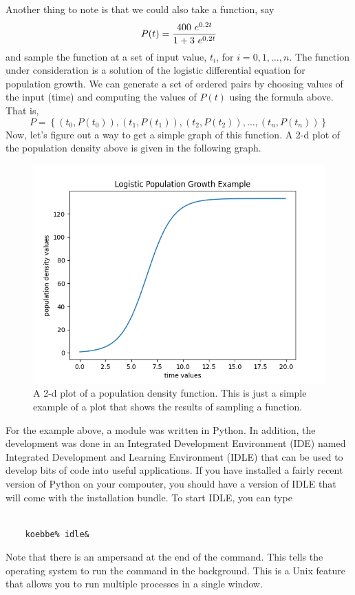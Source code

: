 \documentclass[10pt,fleqn]{article}
\begin{document}
Another thing to note is that we could also take a function, say
\[
   P(t) = {{400\ e^{0.2 t}}\over{1 + 3\ e^{0.2 t}}}
\]
and sample the function at a set of input value, \(t_i\), for
\(i=0,1,\ldots,n\). The function under consideration is a solution of the
logistic differential equation for population growth. We can generate a set of
ordered pairs by choosing values of the input (time) and computing the values of
$P(t)$ using the formula above. That is,
\[
  P = \left\lbrace 
       (t_0, P(t_0)), (t_1, P(t_1)), (t_2, P(t_2)), \ldots, (t_n, P(t_n))
      \right\rbrace 
\]
Now, let's figure out a way to get a simple graph of this function. A 2-d plot
of the population density above is given in the following graph.
\vfill
\begin{figure}[h]
\centering
\includegraphics[width=6.0in]{../images/2dplot_01.png}
\vskip0.1in
\caption{A 2-d plot of a population density function. This is just a simple
         example of a plot that shows the results of sampling a function.}
\end{figure}
\eject

For the example above, a module was written in Python. In addition, the
development was done in an Integrated Development Environment (IDE) named
Integrated Development and Learning Environment (IDLE) that can be used to
develop bits of code into useful applications. If you have installed a fairly
recent version of Python on your compouter, you should have a version of IDLE
that will come with the installation bundle. To start IDLE, you can type
\begin{verbatim}

    koebbe% idle&

\end{verbatim}
Note that there is an ampersand at the end of the command. This tells the
operating system to run the command in the background. This is a Unix feature
that allows you to run multiple processes in a single window.
\end{document}

